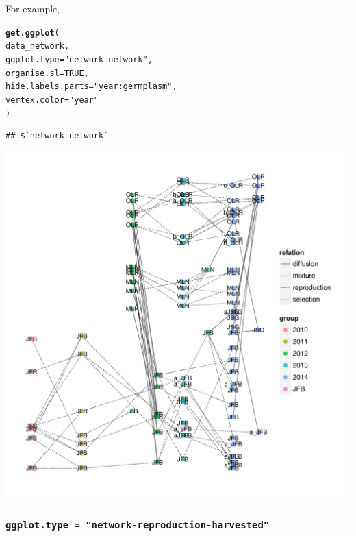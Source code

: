\documentclass{article}\usepackage[]{graphicx}\usepackage[]{color}
\makeatletter
\def\maxwidth{ %
  \ifdim\Gin@nat@width>\linewidth
    \linewidth
  \else
    \Gin@nat@width
  \fi
}
\newcommand{\hlnum}[1]{\textcolor[rgb]{0.686,0.059,0.569}{#1}}%
\newcommand{\hlstr}[1]{\textcolor[rgb]{0.192,0.494,0.8}{#1}}%
\newcommand{\hlstd}[1]{\textcolor[rgb]{0.345,0.345,0.345}{#1}}%
\newcommand{\hlkwc}[1]{\textcolor[rgb]{0.333,0.667,0.333}{#1}}%
\newcommand{\hlkwd}[1]{\textcolor[rgb]{0.737,0.353,0.396}{\textbf{#1}}}%
\newenvironment{kframe}{%
 \def\at@end@of@kframe{}%
 \ifinner\ifhmode%
  \def\at@end@of@kframe{\end{minipage}}%
  \begin{minipage}{\columnwidth}%
 \fi\fi%
 \def\FrameCommand##1{\hskip\@totalleftmargin \hskip-\fboxsep
 \colorbox{shadecolor}{##1}\hskip-\fboxsep
     \hskip-\linewidth \hskip-\@totalleftmargin \hskip\columnwidth}%
 \MakeFramed {\advance\hsize-\width
   \@totalleftmargin\z@ \linewidth\hsize
   \@setminipage}}%
 {\par\unskip\endMakeFramed%
 \at@end@of@kframe}
\newenvironment{knitrout}{}{} %
\makeatother
\begin{document}
For example,

\begin{knitrout}
\color{fgcolor}\begin{kframe}
\begin{alltt}
\hlkwd{get.ggplot}\hlstd{(}
        \hlstd{data_network,}
        \hlkwc{ggplot.type} \hlstd{=} \hlstr{"network-network"}\hlstd{,}
        \hlkwc{organise.sl} \hlstd{=} \hlnum{TRUE}\hlstd{,}
        \hlkwc{hide.labels.parts} \hlstd{=} \hlstr{"year:germplasm"}\hlstd{,}
        \hlkwc{vertex.color} \hlstd{=} \hlstr{"year"}
        \hlstd{)}
\end{alltt}
\begin{verbatim}
## $`network-network`
\end{verbatim}
\end{kframe}


{\centering \includegraphics[width=\maxwidth]{figures/shinemas2R_unnamed-chunk-30-1} 

}



\end{knitrout}

\subsubsection{\texttt{ggplot.type = "network-reproduction-harvested"}}
\end{document}
